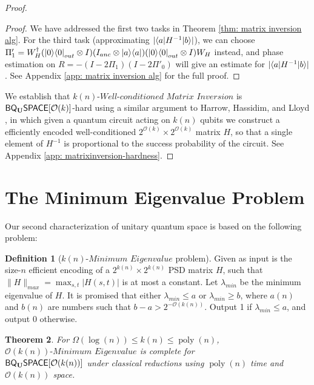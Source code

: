 \documentclass[11pt]{article}
\newtheorem{theorem}{Theorem}
\theoremstyle{definition}
\newtheorem{definition}[theorem]{Definition}
\theoremstyle{remark}
\newcommand\matrixinvert[1]{{\ensuremath{#1}}\textit{-Well-conditioned Matrix Inversion}}
\newcommand\spechamiltonian[1]{\ensuremath{#1}\textit{-Minimum Eigenvalue}}
\newcommand{\classfont}{\sf}
\newcommand{\Unitary}{\mathbf{U}}
\newcommand{\unitaryBQSPACE}[1]{{\classfont{BQ}_\Unitary\classfont{SPACE}}[#1]}
\newcommand\bigoh{\mathcal{O}}
\DeclareMathOperator{\poly}{poly}
\begin{document}
\begin{proof}
\begin{proof}
We have addressed the first two tasks in Theorem \ref{thm: matrix inversion alg}. For the third task (approximating $|{\left\langle{a}\right\vert}H^{-1}{\left\vert{b}\right\rangle}|$), we can choose $\Pi'_1 = W_H^\dagger ({\left\vert{0}\right\rangle}{\left\langle{0}\right\vert}_{out} \otimes I) (I_{anc} \otimes {\left\vert{a}\right\rangle}{\left\langle{a}\right\vert})({\left\vert{0}\right\rangle}{\left\langle{0}\right\vert}_{out} \otimes I) W_H$ instead, and phase estimation on $R=-(I-2\Pi_1)(I-2\Pi'_0)$ will give an estimate for $|{\left\langle{a}\right\vert}H^{-1}{\left\vert{b}\right\rangle}|$. See Appendix \ref{app: matrix inversion alg} for the full proof.
\end{proof}
We establish that $\matrixinvert{k(n)}$ is $\unitaryBQSPACE{\mathcal{O}(k)}$-hard using a similar argument to Harrow, Hassidim, and Lloyd \cite{HHL}, in which given a quantum circuit acting on $k(n)$ qubits we %
construct a efficiently encoded well-conditioned $2^{\mathcal{O}(k)}\times 2^{\mathcal{O}(k)}$ matrix $H$, so that a single element of $H^{-1}$ is proportional to the success probability of the circuit.  See Appendix \ref{app: matrixinversion-hardness}.%
\end{proof}

\section{The Minimum Eigenvalue Problem} \label{sec: Minimum Eigenvalue}
Our second characterization of unitary quantum space is based on the following problem:
\begin{definition}[$\spechamiltonian{k(n)}$ problem] \label{def: spechamiltonian}
Given as input is the size-$n$ efficient encoding of a $2^{k(n)} \times 2^{k(n)}$ PSD matrix $H$, such that %
$\|H\|_{max} = \max_{s,t}|H(s,t)|$ is at most a constant. Let $\lambda_{min}$ be the minimum eigenvalue of $H$. It is promised that either $\lambda_{min} \le a$ or $\lambda_{min} \ge b$, where $a(n)$ and $b(n)$ are numbers such that $b-a > 2^{-\mathcal{O}(k(n))}$. Output 1 if $\lambda_{min} \le a$, and output 0 otherwise.
\end{definition}

\begin{theorem} \label{thm: spechamiltonian}
For $\Omega(\log(n)) \le k(n) \le \poly(n)$, $\spechamiltonian{\mathcal{O}(k(n))}$ is complete for \\ $\unitaryBQSPACE{\mathcal{O}(k(n))}$ under classical reductions using $\poly(n)$ time and $\mathcal{O}(k(n))$ space.
\end{theorem}
\end{document}

